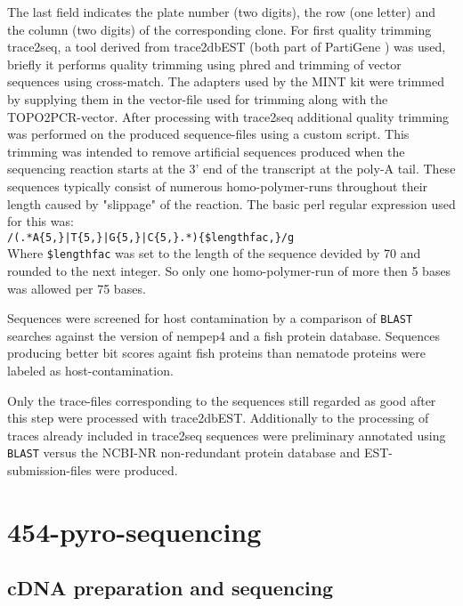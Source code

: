 The last field indicates the plate number (two digits), the row (one
letter) and the column (two digits) of the corresponding clone. For
first quality trimming trace2seq, a tool derived from trace2dbEST
(both part of PartiGene \cite{parkinson_partigene--constructing_2004})
was used, briefly it performs quality trimming using
phred\cite{ewing_base-calling_1998} and trimming of vector sequences
using cross-match\cite{PHRAP}. The adapters used by the MINT kit were
trimmed by supplying them in the vector-file used for trimming along
with the TOPO2PCR-vector. After processing with trace2seq additional
quality trimming was performed on the produced sequence-files using a
custom script. This trimming was intended to remove artificial
sequences produced when the sequencing reaction starts at the 3' end
of the transcript at the poly-A tail. These sequences typically
consist of numerous homo-polymer-runs throughout their length caused
by "slippage" of the reaction.
The basic perl regular expression used for this was:\\

\texttt{/(.*A\{5,\}|T\{5,\}|G\{5,\}|C\{5,\}.*)\{\$lengthfac,\}/g}\\

Where \texttt{\$lengthfac} was set to the length of the sequence
devided by 70 and rounded to the next integer. So only one
homo-polymer-run of more then 5 bases was allowed per 75 bases.

Sequences were screened for host contamination by a comparison of
\texttt{BLAST} searches against the version of nempep4 and a fish
protein database. Sequences producing better bit scores againt fish
proteins than nematode proteins were labeled as host-contamination.

Only the trace-files corresponding to the sequences still regarded as
good after this step were processed with trace2dbEST. Additionally to
the processing of traces already included in trace2seq sequences were
preliminary annotated using \texttt{BLAST} versus the NCBI-NR
non-redundant protein database and EST-submission-files were produced.

\section{454-pyro-sequencing}

\subsection{cDNA preparation and sequencing}

